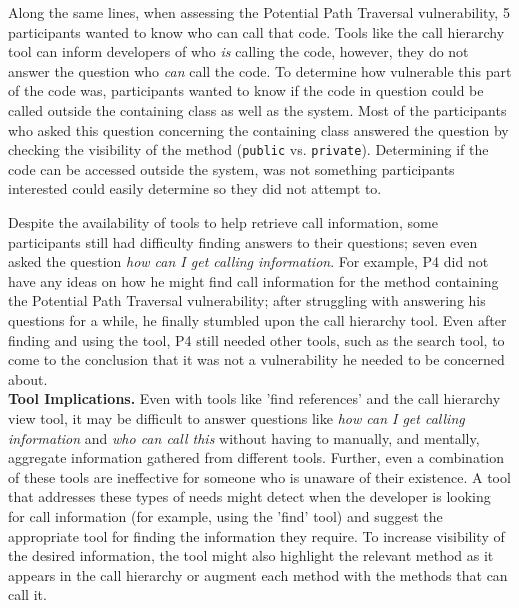 \documentclass[conference]{IEEEtran}
\begin{document}
Along the same lines, when assessing the Potential Path Traversal vulnerability, 5 participants wanted to know who can call that code. 
Tools like the call hierarchy tool can inform developers of who \textit{is} calling the code, however, they do not answer the question who \textit{can} call the code. 
To determine how vulnerable this part of the code was, participants wanted to know if the code in question could be called outside the containing class as well as the system. 
Most of the participants who asked this question concerning the containing class answered the question by checking the visibility of the method (\texttt{public} vs. \texttt{private}). 
Determining if the code can be accessed outside the system, was not something participants interested could easily determine so they did not attempt to.

Despite the availability of tools to help retrieve call information, some participants still had difficulty finding answers to their questions; seven even asked the question \textit{how can I get calling information}.
For example, P4 did not have any ideas on how he might find call information for the method containing the Potential Path Traversal vulnerability; after struggling with answering his questions for a while, he finally stumbled upon the call hierarchy tool. 
Even after finding and using the tool, P4 still needed other tools, such as the search tool, to come to the conclusion that it was not a vulnerability he needed to be concerned about.
\\


\noindent\textbf{Tool Implications.}
Even with tools like 'find references' and the call hierarchy view tool, it may be difficult to answer questions like \emph{how can I get calling information} and \emph{who can call this} without having to manually, and mentally, aggregate information gathered from different tools. 
Further, even a combination of these tools are ineffective for someone who is unaware of their existence.
A tool that addresses these types of needs might detect when the developer is looking for call information (for example, using the 'find' tool) and suggest the appropriate tool for finding the information they require. 
To increase visibility of the desired information, the tool might also highlight the relevant method as it appears in the call hierarchy or augment each method with the methods that can call it.
\end{document}
